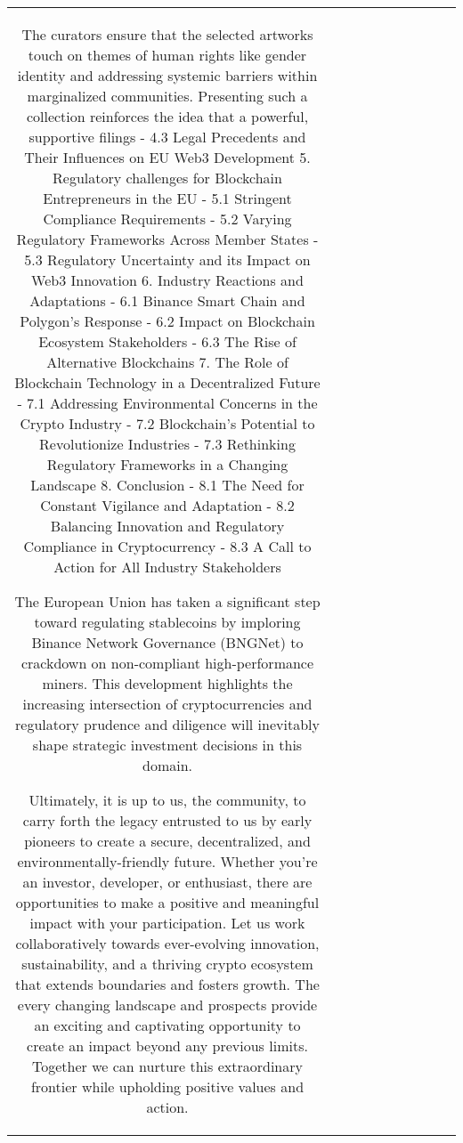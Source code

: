 \begin{table}[h!]
\begin{tabular}{|c|c|c|c|c|c|c|c|c|c|}
The curators ensure that the selected artworks touch on themes of human rights like gender identity and addressing systemic barriers within marginalized communities. Presenting such a collection reinforces the idea that a powerful, supportive filings - 4.3 Legal Precedents and Their Influences on EU Web3 Development 5. Regulatory challenges for Blockchain Entrepreneurs in the EU - 5.1 Stringent Compliance Requirements - 5.2 Varying Regulatory Frameworks Across Member States - 5.3 Regulatory Uncertainty and its Impact on Web3 Innovation 6. Industry Reactions and Adaptations - 6.1 Binance Smart Chain and Polygon’s Response - 6.2 Impact on Blockchain Ecosystem Stakeholders - 6.3 The Rise of Alternative Blockchains 7. The Role of Blockchain Technology in a Decentralized Future - 7.1 Addressing Environmental Concerns in the Crypto Industry - 7.2 Blockchain’s Potential to Revolutionize Industries - 7.3 Rethinking Regulatory Frameworks in a Changing Landscape 8. Conclusion - 8.1 The Need for Constant Vigilance and Adaptation - 8.2 Balancing Innovation and Regulatory Compliance in Cryptocurrency - 8.3 A Call to Action for All Industry Stakeholders

The European Union has taken a significant step toward regulating stablecoins by imploring Binance Network Governance (BNGNet) to crackdown on non-compliant high-performance miners. This development highlights the increasing intersection of cryptocurrencies and regulatory prudence and diligence will inevitably shape strategic investment decisions in this domain.

Ultimately, it is up to us, the community, to carry forth the legacy entrusted to us by early pioneers to create a secure, decentralized, and environmentally-friendly future. Whether you’re an investor, developer, or enthusiast, there are opportunities to make a positive and meaningful impact with your participation. Let us work collaboratively towards ever-evolving innovation, sustainability, and a thriving crypto ecosystem that extends boundaries and fosters growth. The every changing landscape and prospects provide an exciting and captivating opportunity to create an impact beyond any previous limits. Together we can nurture this extraordinary frontier while upholding positive values and action.


\end{tabular}
\end{table}
